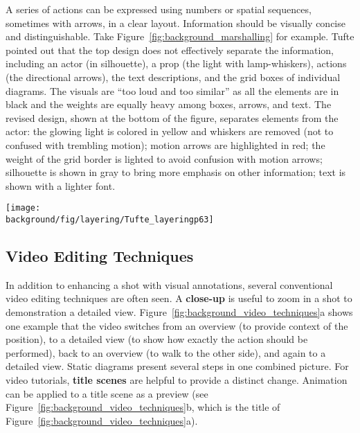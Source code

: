 A series of actions can be expressed using numbers or spatial sequences, sometimes with arrows, in a clear layout.
%
Information should be visually concise and distinguishable. Take Figure~\ref{fig:background_marshalling} for example. Tufte pointed out that the top design does not effectively separate the information, including an actor (in silhouette), a prop (the light with lamp-whiskers), actions (the directional arrows), the text descriptions, and the grid boxes of individual diagrams. The visuals are ``too loud and too similar'' as all the elements are in black and the weights are equally heavy among boxes, arrows, and text.
%
The revised design, shown at the bottom of the figure, separates elements from the actor: the glowing light is colored in yellow and whiskers are removed (not to confused with trembling motion); motion arrows are highlighted in red; the weight of the grid border is lighted to avoid confusion with motion arrows; silhouette is shown in gray to bring more emphasis on other information; text is shown with a lighter font.

\begin{figure*}[th!]
  \centering
  \texttt{[image: \\background/fig/layering/Tufte\_layeringp63]}
  \caption{By carefully designing visual elements using color and weight, information can be visually separated~\cite{tufte1990envisioning}. The bottom design is revised from the top example via changes of these factors.
  }
  \label{fig:background_marshalling}
\end{figure*}



\subsection{Video Editing Techniques}

In addition to enhancing a shot with visual annotations, several conventional video editing techniques are often seen. A \textbf{close-up} is useful to zoom in a shot to demonstration a detailed view. Figure~\ref{fig:background_video_techniques}a shows one example that the video switches from an overview (to provide context of the position), to a detailed view (to show how exactly the action should be performed), back to an overview (to walk to the other side), and again to a detailed view.
%
Static diagrams present several steps in one combined picture. For video tutorials, \textbf{title scenes} are helpful to provide a distinct change. Animation can be applied to a title scene as a preview (see Figure~\ref{fig:background_video_techniques}b, which is the title of Figure~\ref{fig:background_video_techniques}a).

